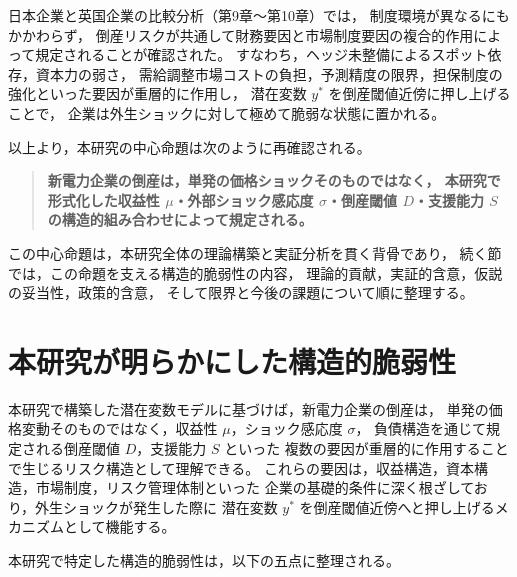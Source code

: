 日本企業と英国企業の比較分析（第9章〜第10章）では，
制度環境が異なるにもかかわらず，
倒産リスクが共通して財務要因と市場制度要因の複合的作用によって規定されることが確認された。
すなわち，ヘッジ未整備によるスポット依存，資本力の弱さ，
需給調整市場コストの負担，予測精度の限界，担保制度の強化といった要因が重層的に作用し，
潜在変数 $y^*$ を倒産閾値近傍に押し上げることで，
企業は外生ショックに対して極めて脆弱な状態に置かれる。

以上より，本研究の中心命題は次のように再確認される。

\begin{quote}
\textbf{
新電力企業の倒産は，単発の価格ショックそのものではなく，
本研究で形式化した収益性 $\mu$・外部ショック感応度 $\sigma$・倒産閾値 $D$・支援能力 $S$
の構造的組み合わせによって規定される。
}
\end{quote}


この中心命題は，本研究全体の理論構築と実証分析を貫く背骨であり，
続く節では，この命題を支える構造的脆弱性の内容，
理論的貢献，実証的含意，仮説の妥当性，政策的含意，
そして限界と今後の課題について順に整理する。


\section{本研究が明らかにした構造的脆弱性}

本研究で構築した潜在変数モデルに基づけば，新電力企業の倒産は，
単発の価格変動そのものではなく，収益性 $\mu$，ショック感応度 $\sigma$，
負債構造を通じて規定される倒産閾値 $D$，支援能力 $S$ といった
複数の要因が重層的に作用することで生じるリスク構造として理解できる。
これらの要因は，収益構造，資本構造，市場制度，リスク管理体制といった
企業の基礎的条件に深く根ざしており，外生ショックが発生した際に
潜在変数 $y^*$ を倒産閾値近傍へと押し上げるメカニズムとして機能する。

本研究で特定した構造的脆弱性は，以下の五点に整理される。

